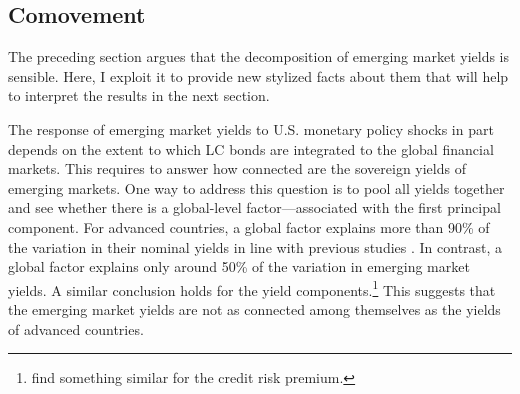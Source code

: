 {%


\subsection{Comovement} \label{sec:globalPC}
\iftoggle{toclinks}{\gototoc}{} %

The preceding section argues that the decomposition of emerging market yields is sensible. Here, I exploit it to provide new stylized facts about them that will help to interpret the results in the next section.

The response of emerging market yields to U.S. monetary policy shocks in part depends on the extent to which LC bonds are integrated to the global financial markets.
This requires to answer how connected are the sovereign yields of emerging markets.
One way to address this question is to pool all yields together and see whether there is a global-level factor---associated with the first principal component.
For advanced countries, a global factor explains more than 90\% of the variation in their nominal yields in line with previous studies \citep{DahlquistHasseltoft:2016}.
In contrast, a global factor explains only around 50\% of the variation in emerging market yields. 
A similar conclusion holds for the yield components.\footnote{ \cite{DuSchreger:2016JoF} find something similar for the credit risk premium.}
This suggests that the emerging market yields are not as connected among themselves as the yields of advanced countries.

}
